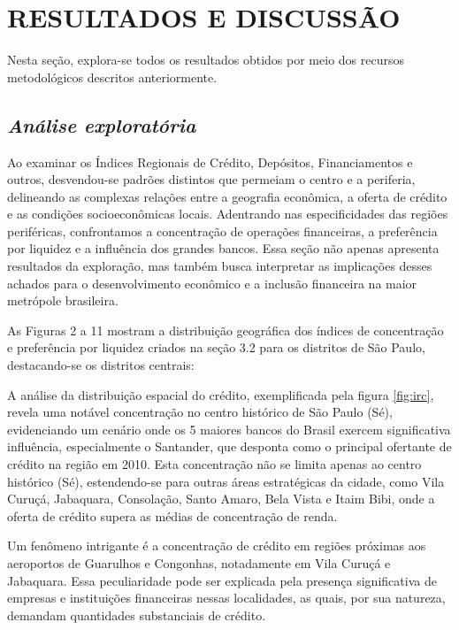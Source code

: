 \documentclass[a4paper,12pt]{article}
\begin{document}
\hypertarget{resultados-e-discussuxe3o}{%
\section{RESULTADOS E DISCUSSÃO}\label{resultados-e-discussuxe3o}}

Nesta seção, explora-se todos os resultados obtidos por meio dos
recursos metodológicos descritos anteriormente.

\hypertarget{anuxe1lise-exploratuxf3ria}{%
\subsection{\texorpdfstring{\emph{Análise
exploratória}}{Análise exploratória}}\label{anuxe1lise-exploratuxf3ria}}

Ao examinar os Índices Regionais de Crédito, Depósitos, Financiamentos e
outros, desvendou-se padrões distintos que permeiam o centro e a
periferia, delineando as complexas relações entre a geografia econômica,
a oferta de crédito e as condições socioeconômicas locais. Adentrando
nas especificidades das regiões periféricas, confrontamos a concentração
de operações financeiras, a preferência por liquidez e a influência dos
grandes bancos. Essa seção não apenas apresenta resultados da
exploração, mas também busca interpretar as implicações desses achados
para o desenvolvimento econômico e a inclusão financeira na maior
metrópole brasileira.

As Figuras 2 a 11 mostram a distribuição geográfica dos índices de
concentração e preferência por liquidez criados na seção 3.2 para os
distritos de São Paulo, destacando-se os distritos centrais:

A análise da distribuição espacial do crédito, exemplificada pela figura
\ref{fig:irc}, revela uma notável concentração no centro histórico de
São Paulo (Sé), evidenciando um cenário onde os 5 maiores bancos do
Brasil exercem significativa influência, especialmente o Santander, que
desponta como o principal ofertante de crédito na região em 2010. Esta
concentração não se limita apenas ao centro histórico (Sé),
estendendo-se para outras áreas estratégicas da cidade, como Vila
Curuçá, Jabaquara, Consolação, Santo Amaro, Bela Vista e Itaim Bibi,
onde a oferta de crédito supera as médias de concentração de renda.

Um fenômeno intrigante é a concentração de crédito em regiões próximas
aos aeroportos de Guarulhos e Congonhas, notadamente em Vila Curuçá e
Jabaquara. Essa peculiaridade pode ser explicada pela presença
significativa de empresas e instituições financeiras nessas localidades,
as quais, por sua natureza, demandam quantidades substanciais de
crédito.
\end{document}
